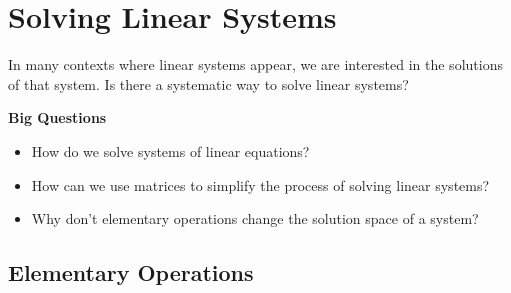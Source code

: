 \eject

\section{Solving Linear Systems}

In many contexts where linear systems appear, we are interested in the solutions of that system. Is there a systematic way to solve linear systems? 

\begin{colourframe}[tolGrey]{\bf Big Questions}
	\begin{itemize}
		\item How do we solve systems of linear equations?
		\item How can we use matrices to simplify the process of solving linear systems?
		\item Why don't elementary operations change the solution space of a system?
	\end{itemize}
\end{colourframe}


\subsection*{Elementary Operations}


